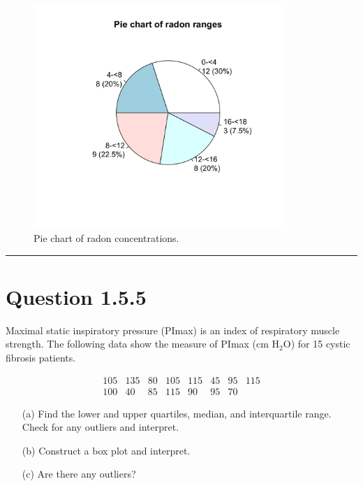 \documentclass[12pt]{article}
\begin{document}
\begin{figure}[H]
\centering
\includegraphics[width=0.85\textwidth]{1.4.14_c.png}
\caption{Pie chart of radon concentrations.}
\end{figure}

\noindent\rule{\textwidth}{0.4pt} %



\section*{Question 1.5.5}
Maximal static inspiratory pressure (PImax) is an index of respiratory muscle strength. 
The following data show the measure of PImax (cm H$_2$O) for 15 cystic fibrosis patients.

\[
\begin{array}{cccccccc}
105 & 135 & 80 & 105 & 115 & 45 & 95 & 115 \\
100 & 40 & 85 & 115 & 90 & 95 & 70 &
\end{array}
\]

\begin{enumerate}
    \item[(a)] Find the lower and upper quartiles, median, and interquartile range. 
    Check for any outliers and interpret.
    
    \item[(b)] Construct a box plot and interpret.
    
    \item[(c)] Are there any outliers?
\end{enumerate}
\end{document}
